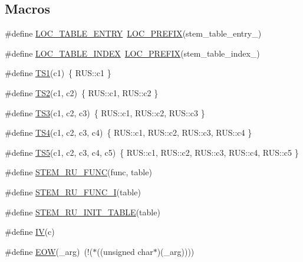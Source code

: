 \subsection*{Macros}
\begin{DoxyCompactItemize}
\item 
\#define \hyperlink{sphinxstemru_8inl_a69a52cd83db63767cd7b7b3759167736}{L\-O\-C\-\_\-\-T\-A\-B\-L\-E\-\_\-\-E\-N\-T\-R\-Y}~\hyperlink{sphinxstemru_8inl_a239cc7b2d29b4af3b38b5c1871a09587}{L\-O\-C\-\_\-\-P\-R\-E\-F\-I\-X}(stem\-\_\-table\-\_\-entry\-\_\-)
\item 
\#define \hyperlink{sphinxstemru_8inl_aaf372d440210e65a7745e17c2b589036}{L\-O\-C\-\_\-\-T\-A\-B\-L\-E\-\_\-\-I\-N\-D\-E\-X}~\hyperlink{sphinxstemru_8inl_a239cc7b2d29b4af3b38b5c1871a09587}{L\-O\-C\-\_\-\-P\-R\-E\-F\-I\-X}(stem\-\_\-table\-\_\-index\-\_\-)
\item 
\#define \hyperlink{sphinxstemru_8inl_a96d8df9f396f6badae25ad4f3fc85f8c}{T\-S1}(c1)~\{ R\-U\-S\-::c1 \}
\item 
\#define \hyperlink{sphinxstemru_8inl_ad4df4fe2a5893d873ac3bc5b61d12f83}{T\-S2}(c1, c2)~\{ R\-U\-S\-::c1, R\-U\-S\-::c2 \}
\item 
\#define \hyperlink{sphinxstemru_8inl_a3904e45baa612d7dd78080b8b7d43a0d}{T\-S3}(c1, c2, c3)~\{ R\-U\-S\-::c1, R\-U\-S\-::c2, R\-U\-S\-::c3 \}
\item 
\#define \hyperlink{sphinxstemru_8inl_abde8eea4803507d7be5f8d57310911dd}{T\-S4}(c1, c2, c3, c4)~\{ R\-U\-S\-::c1, R\-U\-S\-::c2, R\-U\-S\-::c3, R\-U\-S\-::c4 \}
\item 
\#define \hyperlink{sphinxstemru_8inl_a59efeb3cd21f84c68e9d2549be4efb49}{T\-S5}(c1, c2, c3, c4, c5)~\{ R\-U\-S\-::c1, R\-U\-S\-::c2, R\-U\-S\-::c3, R\-U\-S\-::c4, R\-U\-S\-::c5 \}
\item 
\#define \hyperlink{sphinxstemru_8inl_a36c00b15c00a042d74c0849d6b25e862}{S\-T\-E\-M\-\_\-\-R\-U\-\_\-\-F\-U\-N\-C}(func, table)
\item 
\#define \hyperlink{sphinxstemru_8inl_a6e7f6bd54e6ef2a83d0da0c5e559870e}{S\-T\-E\-M\-\_\-\-R\-U\-\_\-\-F\-U\-N\-C\-\_\-\-I}(table)
\item 
\#define \hyperlink{sphinxstemru_8inl_ae41a9a4a6115e8f0b80e3aa7e9700bc8}{S\-T\-E\-M\-\_\-\-R\-U\-\_\-\-I\-N\-I\-T\-\_\-\-T\-A\-B\-L\-E}(table)
\item 
\#define \hyperlink{sphinxstemru_8inl_a4cbdff86fa3b51b26929d1fddc418342}{I\-V}(c)
\item 
\#define \hyperlink{sphinxstemru_8inl_a901d969e54b3eefac55649418c355e09}{E\-O\-W}(\-\_\-arg)~(!($\ast$((unsigned char$\ast$)(\-\_\-arg))))

\end{DoxyCompactItemize}
